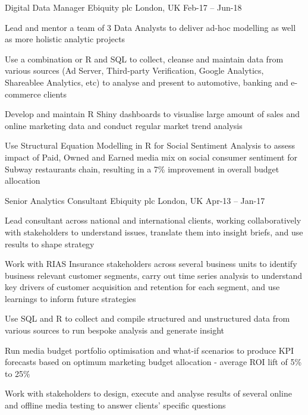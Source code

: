 \begin{cventries}
  \cventry
    {Digital Data Manager} %
    {Ebiquity plc} %
    {London, UK} %
    {Feb-17 – Jun-18} %
    {
      \begin{cvitems} %
        \item {Lead and mentor a team of 3 Data Analysts to deliver ad-hoc modelling as well as more holistic analytic projects}
        \item {Use a combination or R and SQL to collect, cleanse and maintain data from various sources (Ad Server, Third-party Verification, Google Analytics, Shareablee Analytics, etc) to analyse and present to automotive, banking and e-commerce clients}
        \item {Develop and maintain R Shiny dashboards to visualise large amount of sales and online marketing data and conduct regular market trend analysis}
        \item {Use Structural Equation Modelling in R for Social Sentiment Analysis to assess impact of Paid, Owned and Earned media mix on social consumer sentiment for Subway restaurants chain, resulting in a 7\% improvement in overall budget allocation}
      \end{cvitems}
    }

  \cventry
    {Senior Analytics Consultant} %
    {Ebiquity plc} %
    {London, UK} %
    {Apr-13 – Jan-17} %
    {
      \begin{cvitems} %
        \item {Lead consultant across national and international clients, working collaboratively with stakeholders to understand issues, translate them into insight briefs, and use results to shape strategy}
        \item {Work with RIAS Insurance stakeholders across several business units to identify business relevant customer segments, carry out time series analysis to understand key drivers of customer acquisition and retention for each segment, and use learnings to inform future strategies}
        \item {Use SQL and R to collect and compile structured and unstructured data from various sources to run bespoke analysis and generate insight}
        \item {Run media budget portfolio optimisation and what-if scenarios to produce KPI forecasts based on optimum marketing budget allocation - average ROI lift of 5\% to 25\%}
        \item {Work with stakeholders to design, execute and analyse results of several online and offline media testing to answer clients’ specific questions}
      \end{cvitems}
    }


\end{cventries}

